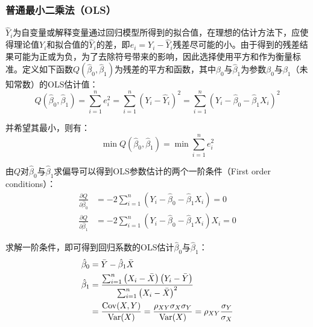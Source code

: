 \documentclass[11pt]{article}
\begin{document}
\subsubsection{普通最小二乘法（OLS）}

$\hat{Y}_i$为自变量或解释变量通过回归模型所得到的拟合值，在理想的估计方法下，应使得理论值$Y_i$和拟合值的$\hat{Y}_i$的差，即$e_i = Y_i - \hat{Y}_i$残差尽可能的小。由于得到的残差结果可能为正或为负，为了去除符号带来的影响，因此选择使用平方和作为衡量标准。定义如下函数$Q(\hat{\beta}_0, \hat{\beta}_1)$为残差的平方和函数，其中$\hat{\beta}_0$与$\hat{\beta}_1$为参数$\beta_0$与$\beta_1$（未知常数）的OLS估计值：
\begin{equation*}
    Q(\hat{\beta}_0, \hat{\beta}_1)
    = \sum_{i=1}^{n} e_i^2
    = \sum_{i=1}^{n} \left( Y_i - \hat{Y}_i \right)^2
    = \sum_{i=1}^{n} \left( Y_i - \hat{\beta}_0 - \hat{\beta}_1 X_i \right)^2
\end{equation*}

并希望其最小，则有：
\begin{equation*}
    \min Q(\hat{\beta}_0, \hat{\beta}_1) = \min \sum_{i=1}^{n} e_i^2
\end{equation*}

由$Q$对$\hat{\beta}_0$与$\hat{\beta}_1$求偏导可以得到OLS参数估计的两个一阶条件（First order conditions）：
\begin{align*}
    \frac{\partial Q}{\partial \hat{\beta}_0} &= -2 \sum_{i=1}^{n} \left( Y_i - \hat{\beta}_0 - \hat{\beta}_1 X_i \right) = 0 \\
    \frac{\partial Q}{\partial \hat{\beta}_1} &= -2 \sum_{i=1}^{n} \left( Y_i - \hat{\beta}_0 - \hat{\beta}_1 X_i \right) X_i = 0
\end{align*}

求解一阶条件，即可得到回归系数的OLS估计$\hat{\beta}_0$与$\hat{\beta}_1$：
\begin{align*}
    \hat{\beta}_0 &= \bar{Y} - \hat{\beta}_1 \bar{X} \\
    \hat{\beta}_1 &= \frac{\sum_{i=1}^{n} \left(X_i - \bar{X}\right) \left(Y_i - \bar{Y}\right)}{\sum_{i=1}^{n} \left(X_i - \bar{X}\right)^2} \\
    &= \frac{\operatorname{Cov}(X,Y)}{\operatorname{Var}(X)} = \frac{\rho_{XY} \sigma_X \sigma_Y}{\operatorname{Var}(X)} = \rho_{XY} \frac{\sigma_Y}{\sigma_X}
\end{align*}
\end{document}
